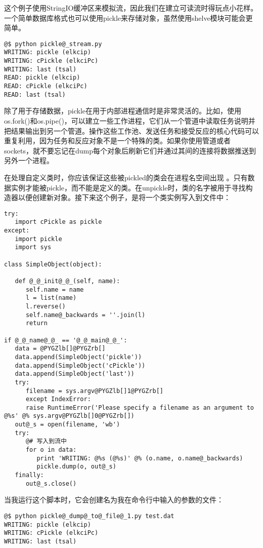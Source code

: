\documentclass[letterpaper,10pt,english]{manual}
\begin{document}
这个例子使用StringIO缓冲区来模拟流，因此我们在建立可读流时得玩点小花样。一个简单数据库格式也可以使用pickle来存储对象，虽然使用shelve模块可能会更简单。

\begin{Verbatim}[commandchars=@\[\]]
@$ python pickle@_stream.py
WRITING: pickle (elkcip)
WRITING: cPickle (elkciPc)
WRITING: last (tsal)
READ: pickle (elkcip)
READ: cPickle (elkciPc)
READ: last (tsal)
\end{Verbatim}

除了用于存储数据，pickle在用于内部进程通信时是非常灵活的。比如，使用os.fork()和os.pipe()，可以建立一些工作进程，它们从一个管道中读取任务说明并把结果输出到另一个管道。操作这些工作池、发送任务和接受反应的核心代码可以重复利用，因为任务和反应对象不是一个特殊的类。如果你使用管道或者sockets，就不要忘记在dump每个对象后刷新它们并通过其间的连接将数据推送到另外一个进程。

在处理自定义类时，你应该保证这些被pickled的类会在进程名空间出现 。只有数据实例才能被pickle，而不能是定义的类。在unpickle时，类的名字被用于寻找构造器以便创建新对象。接下来这个例子，是将一个类实例写入到文件中：

\begin{Verbatim}[commandchars=@\[\]]
try:
   import cPickle as pickle
except:
   import pickle
   import sys

class SimpleObject(object):

   def @_@_init@_@_(self, name):
      self.name = name
      l = list(name)
      l.reverse()
      self.name@_backwards = ''.join(l)
      return

if @_@_name@_@_ == '@_@_main@_@_':
   data = @PYGZlb[]@PYGZrb[]
   data.append(SimpleObject('pickle'))
   data.append(SimpleObject('cPickle'))
   data.append(SimpleObject('last'))
   try:
      filename = sys.argv@PYGZlb[]1@PYGZrb[]
      except IndexError:
      raise RuntimeError('Please specify a filename as an argument to @%s' @% sys.argv@PYGZlb[]0@PYGZrb[])
   out@_s = open(filename, 'wb')
   try:
      @# 写入到流中
      for o in data:
         print 'WRITING: @%s (@%s)' @% (o.name, o.name@_backwards)
         pickle.dump(o, out@_s)
   finally:
      out@_s.close()
\end{Verbatim}

当我运行这个脚本时，它会创建名为我在命令行中输入的参数的文件：

\begin{Verbatim}[commandchars=@\[\]]
@$ python pickle@_dump@_to@_file@_1.py test.dat
WRITING: pickle (elkcip)
WRITING: cPickle (elkciPc)
WRITING: last (tsal)
\end{Verbatim}
\end{document}

